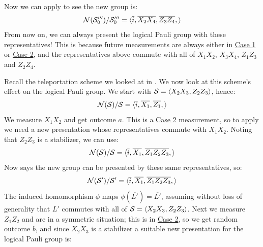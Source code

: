 \begin{example}
    Now we can apply  to see the new group is:
    \begin{equation}
        \mathcal{N}(\mathcal{S}_{0}''')/\mathcal{S}_{0}''' = \langle
        \overline{i},
        \overline{X_2 X_4}, \overline{Z_3 Z_4},
        \rangle
    \end{equation}
    From now on, we can always present the logical Pauli group with these representatives!
    This is because future measurements are always either in \hyperref[thm:stabilizer_group_update_measurement:case1]{Case 1} or \hyperref[thm:stabilizer_group_update_measurement:case2]{Case 2}, and the representatives above commute with all of $X_1 X_2$, $X_3 X_4$, $Z_1 Z_3$ and $Z_2 Z_4$.
\end{example}

\begin{example}\label{ex:teleportation_logical_pauli_group_updates}
    Recall the teleportation scheme we looked at in .
    We now look at this scheme's effect on the logical Pauli group.
    We start with $\mathcal{S} = \langle X_2 X_3, Z_2 Z_3 \rangle$, hence:
    \begin{equation}
        \mathcal{N}(\mathcal{S})/\mathcal{S} = \langle
            \overline{i},
            \overline{X_1}, \overline{Z_1},
        \rangle
    \end{equation}
    We measure $X_1 X_2$ and get outcome $a$.
    This is a \hyperref[thm:stabilizer_group_update_measurement:case2]{Case 2} measurement, so to apply  we need a new presentation whose representatives commute with $X_1 X_2$.
    Noting that $Z_2 Z_3$ is a stabilizer, we can use:
    \begin{equation}
        \mathcal{N}(\mathcal{S})/\mathcal{S} = \langle
            \overline{i},
            \overline{X_1}, \overline{Z_1 Z_2 Z_3},
        \rangle
    \end{equation}
    Now  says the new group can be presented by these same representatives, so:
    \begin{equation}
        \mathcal{N}(\mathcal{S}')/\mathcal{S}' = \langle
        \overline{i},
        \overline{X_1}, \overline{Z_1 Z_2 Z_3},
        \rangle
    \end{equation}
    The induced homomorphism $\phi$ maps $\phi(\overline{L'}) = \overline{L'}$, assuming without loss of generality that $L'$ commutes with all of $\mathcal{S} = \langle X_2 X_3, Z_2 Z_3 \rangle$.
    Next we measure $Z_1 Z_2$ and are in a symmetric situation; this is in \hyperref[thm:stabilizer_group_update_measurement:case2]{Case 2}, so we get random outcome $b$, and since $X_2 X_3$ is a stabilizer a suitable new presentation for the logical Pauli group is:

\end{example}
